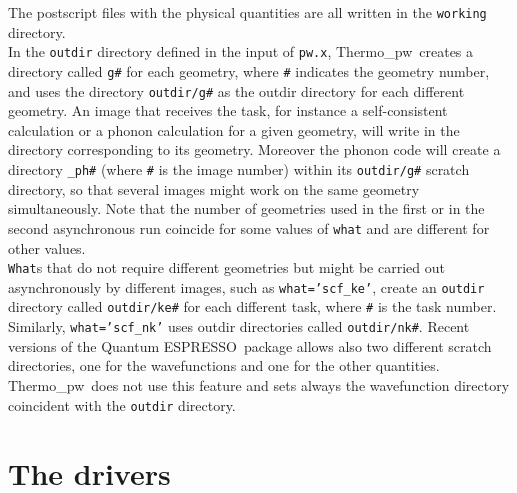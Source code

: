\documentclass[12pt,a4paper,twoside]{report}
\def\qe{{\sc Quantum ESPRESSO}}
\def\tpw{{\sc Thermo}\_{\sc pw}}
\begin{document}
The postscript files with the physical quantities are all written in
the \texttt{working} directory. \\
In the \texttt{outdir} directory defined in the input of \texttt{pw.x},
\tpw\ creates a directory called \texttt{g\#} for each geometry, 
where \texttt{\#} indicates the geometry number, and uses the directory 
\texttt{outdir/g\#} as the outdir directory for each different geometry. 
An image that receives the task, for instance a self-consistent calculation 
or a phonon calculation for a given geometry, will write in the directory 
corresponding to its geometry.
Moreover the phonon code will create a directory \texttt{\_ph\#} 
(where \texttt{\#} is the image number) within its \texttt{outdir/g\#} scratch 
directory, so that several images might work on the same geometry 
simultaneously.
Note that the number of geometries used in the first or in the second
asynchronous run coincide for some values of \texttt{what} and are
different for other values. \\
\texttt{What}s that do not require different geometries but might be carried
out asynchronously by different images, such as \texttt{what='scf\_ke'}, 
create an \texttt{outdir} directory called
\texttt{outdir/ke\#} for each different task, where \texttt{\#} is the
task number. Similarly, \texttt{what='scf\_nk'} uses outdir directories
called \texttt{outdir/nk\#}.
Recent versions of the \qe\ package allows also two different scratch
directories, one for the wavefunctions and one for the other quantities.
\tpw\ does not use this feature and sets always the wavefunction
directory coincident with the \texttt{outdir} directory.

\newpage
{\color{dark-blue}\chapter{The drivers}}
\color{black}
\end{document}
